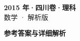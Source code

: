\documentclass[zihao=-4, a4paper]{ctexart}
\begin{document}
\begin{center}
  {\Large\bfseries 2015 年·四川卷·理科}\\[4pt]
  {\large 数学 · 解析版}
\end{center}
\medskip
{}

\clearpage
{}
\begin{center}{\Large\bfseries 参考答案与详细解析}\end{center}
\medskip

\end{document}
